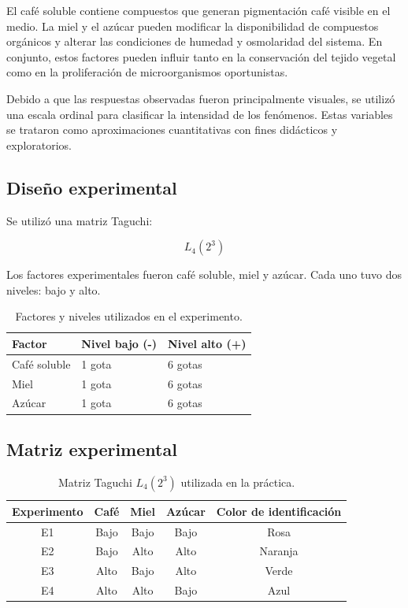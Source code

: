 El café soluble contiene compuestos que generan pigmentación café visible en el medio. La miel y el azúcar pueden modificar la disponibilidad de compuestos orgánicos y alterar las condiciones de humedad y osmolaridad del sistema. En conjunto, estos factores pueden influir tanto en la conservación del tejido vegetal como en la proliferación de microorganismos oportunistas.

Debido a que las respuestas observadas fueron principalmente visuales, se utilizó una escala ordinal para clasificar la intensidad de los fenómenos. Estas variables se trataron como aproximaciones cuantitativas con fines didácticos y exploratorios.

\subsection{Diseño experimental}

Se utilizó una matriz Taguchi:

\[
L_4(2^3)
\]

Los factores experimentales fueron café soluble, miel y azúcar. Cada uno tuvo dos niveles: bajo y alto.

\begin{table}[H]
\centering
\begin{tabular}{lll}
\hline
Factor & Nivel bajo (-) & Nivel alto (+) \\
\hline
Café soluble & 1 gota & 6 gotas \\
Miel & 1 gota & 6 gotas \\
Azúcar & 1 gota & 6 gotas \\
\hline
\end{tabular}
\caption{Factores y niveles utilizados en el experimento.}
\end{table}

\subsection{Matriz experimental}

\begin{table}[H]
\centering
\begin{tabular}{ccccc}
\hline
Experimento & Café & Miel & Azúcar & Color de identificación \\
\hline
E1 & Bajo & Bajo & Bajo & Rosa \\
E2 & Bajo & Alto & Alto & Naranja \\
E3 & Alto & Bajo & Alto & Verde \\
E4 & Alto & Alto & Bajo & Azul \\
\hline
\end{tabular}
\caption{Matriz Taguchi \(L_4(2^3)\) utilizada en la práctica.}
\end{table}

